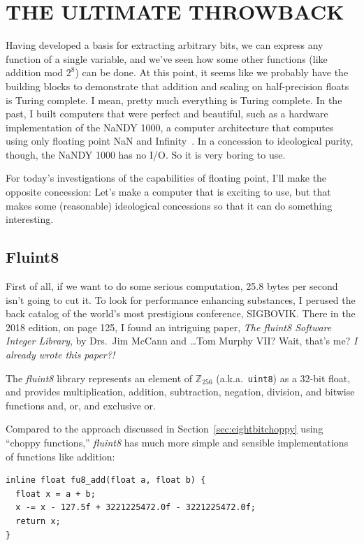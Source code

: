 \documentclass[twocolumn]{article}
\begin{document}
\section{THE ULTIMATE THROWBACK}
Having developed a basis for extracting arbitrary bits, we can express
any function of a single variable, and we've seen how some other
functions (like addition mod $2^8$) can be done. At this point, it
seems like we probably have the building blocks to demonstrate that
addition and scaling on half-precision floats is Turing complete. I
mean, pretty much everything is Turing complete. In the past, I built
computers that were perfect and beautiful, such as a hardware
implementation of the NaNDY 1000, a computer architecture that
computes using only floating point NaN and
Infinity~\cite{murphy2019nan}. In a concession to ideological purity,
though, the NaNDY 1000 has no I/O. So it is very boring to use.

For today's investigations of the capabilities of floating point, I'll
make the opposite concession: Let's make a computer that is exciting
to use, but that makes some (reasonable) ideological concessions so that
it can do something interesting.

\subsection{Fluint8} \label{sec:fluint}

First of all, if we want to do some serious computation, 25.8 bytes
per second isn't going to cut it. To look for performance enhancing
substances, I perused the back catalog of the world's most prestigious
conference, SIGBOVIK. There in the 2018 edition, on page 125, I found
an intriguing paper, {\it The fluint8 Software Integer Library}, by
Drs.~Jim McCann and \ldots Tom Murphy VII? Wait, that's me? {\large \em I already
wrote this paper?!}~\cite{mccann2018fluint}

\medskip
The {\it fluint8} library represents an element of $\mathbb{Z}_{256}$
(a.k.a.~{\tt uint8}) as a 32-bit float, and provides multiplication,
addition, subtraction, negation, division, and bitwise functions and,
or, and exclusive or.

Compared to the approach discussed in Section~\ref{sec:eightbitchoppy}
using ``choppy functions,'' {\it fluint8} has much more simple and
sensible implementations of functions like addition:

\begin{lstlisting}
inline float fu8_add(float a, float b) {
  float x = a + b;
  x -= x - 127.5f + 3221225472.0f - 3221225472.0f;
  return x;
}
\end{lstlisting}
\end{document}
